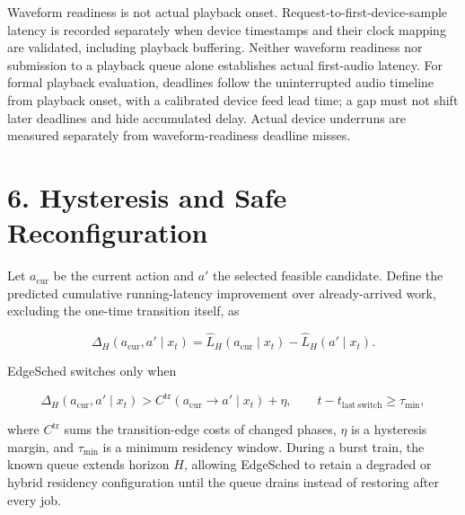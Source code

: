 \documentclass[10pt]{article}
\begin{document}
Waveform readiness is not actual playback onset.  Request-to-first-device-sample
latency is recorded separately when device timestamps and their clock mapping
are validated, including playback buffering.  Neither waveform readiness nor
submission to a playback queue alone establishes actual first-audio latency.
For formal playback evaluation, deadlines follow the uninterrupted audio
timeline from playback onset, with a calibrated device feed lead time; a gap
must not shift later deadlines and hide accumulated delay.  Actual device
underruns are measured separately from waveform-readiness deadline misses.

\section*{6. Hysteresis and Safe Reconfiguration}

Let $a_{\mathrm{cur}}$ be the current action and $a'$ the selected feasible
candidate.  Define the predicted cumulative running-latency improvement over
already-arrived work, excluding the one-time transition itself, as

\begin{equation}
\Delta_H(a_{\mathrm{cur}},a'\mid x_t)=
\widehat L_H(a_{\mathrm{cur}}\mid x_t)
-\widehat L_H(a'\mid x_t).
\end{equation}

EdgeSched switches only when

\begin{equation}
\Delta_H(a_{\mathrm{cur}},a'\mid x_t)
> C^{\mathrm{tr}}(a_{\mathrm{cur}}\!\rightarrow a'\mid x_t)+\eta,
\qquad t-t_{\mathrm{last\ switch}}\ge\tau_{\min},
\end{equation}

where $C^{\mathrm{tr}}$ sums the transition-edge costs of changed phases,
$\eta$ is a hysteresis margin, and $\tau_{\min}$ is a minimum residency window.
During a burst train, the known queue extends horizon $H$, allowing EdgeSched to
retain a degraded or hybrid residency configuration until the queue drains
instead of restoring after every job.
\end{document}
